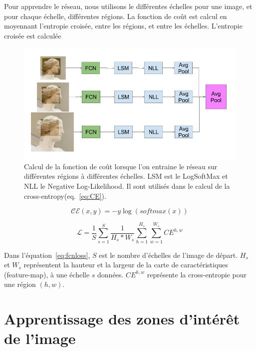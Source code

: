 Pour apprendre le réseau, nous utilisons le différentes échelles pour une image, et pour chaque échelle, différentes régions. La fonction de coût est calcul en moyennant l'entropie croisée, entre les régions, et entre les échelles. L'entropie croisée est calculée 


\begin{figure}
\centering
    \includegraphics[width=\linewidth]{figures/Average_Loss.png}
    \caption{Calcul de la fonction de coût lorsque l'on entraine le réseau sur différentes régions à différentes échelles. LSM est le LogSoftMax et NLL le Negative Log-Likelihood. Il sont utilisés dans le calcul de la cross-entropy(eq.~\ref{eq:CE}).
    \label{fig:regionfinetuning}}
\end{figure}


\begin{equation}\label{eq:CE}
	\mathcal{CE}(x,y) = -y \log(softmax(x))
\end{equation}

\begin{equation}\label{eq:fcnloss}
 \mathcal{L} = \frac{1}{S} \sum_{s=1}^S \frac{1}{H_s*W_s}
\sum_{h=1}^{H_s} \sum_{w=1}^{W_s} \mathit{CE}^{h,w}
\end{equation}


Dans l'équation~\ref{eq:fcnloss}, $S$ est le nombre d'échelles de l'image de départ.
$H_s$ et $W_s$ représentent la hauteur et la largeur de la carte de caractéristiques (feature-map), à une échelle $s$ données.
$CE^{h,w}$ représente la cross-entropie pour une région $(h,w)$.



\section{Apprentissage des zones d'intérêt de l'image}



